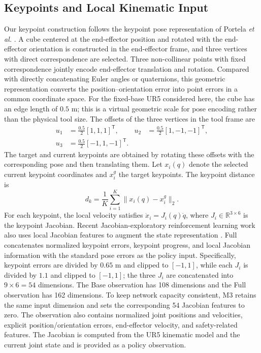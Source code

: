 \documentclass[conference]{IEEEtran}
\begin{document}
\subsection{Keypoints and Local Kinematic Input}
Our keypoint construction follows the keypoint pose representation of Portela \emph{et al.} \cite{portela2025wholebody}. A cube centered at the end-effector position and rotated with the end-effector orientation is constructed in the end-effector frame, and three vertices with direct correspondence are selected. Three non-collinear points with fixed correspondence jointly encode end-effector translation and rotation. Compared with directly concatenating Euler angles or quaternions, this geometric representation converts the position--orientation error into point errors in a common coordinate space. For the fixed-base UR5 considered here, the cube has an edge length of $0.5$ m; this is a virtual geometric scale for pose encoding rather than the physical tool size. The offsets of the three vertices in the tool frame are
\begin{equation*}
\begin{aligned}
u_1&=\tfrac{0.5}{2}[1,1,1]^{\mathsf T}, &
u_2&=\tfrac{0.5}{2}[1,-1,-1]^{\mathsf T},\\
u_3&=\tfrac{0.5}{2}[-1,1,-1]^{\mathsf T}.&&
\end{aligned}
\end{equation*}
The target and current keypoints are obtained by rotating these offsets with the corresponding pose and then translating them. Let $x_i(q)$ denote the selected current keypoint coordinates and $x_i^g$ the target keypoints. The keypoint distance is
\begin{equation}
d_k=\frac{1}{K}\sum_{i=1}^{K}\|x_i(q)-x_i^g\|_2 .
\label{eq:keypoint}
\end{equation}
For each keypoint, the local velocity satisfies $\dot x_i=J_i(q)\dot q$, where $J_i\in\mathbb{R}^{3\times6}$ is the keypoint Jacobian. Recent Jacobian-exploratory reinforcement learning work also uses local Jacobian features to augment the state representation \cite{tian2025jedprl}. Full concatenates normalized keypoint errors, keypoint progress, and local Jacobian information with the standard pose errors as the policy input. Specifically, keypoint errors are divided by $0.65$ m and clipped to $[-1,1]$, while each $J_i$ is divided by $1.1$ and clipped to $[-1,1]$; the three $J_i$ are concatenated into $9\times6=54$ dimensions. The Base observation has 108 dimensions and the Full observation has 162 dimensions. To keep network capacity consistent, M3 retains the same input dimension and sets the corresponding 54 Jacobian features to zero. The observation also contains normalized joint positions and velocities, explicit position/orientation errors, end-effector velocity, and safety-related features. The Jacobian is computed from the UR5 kinematic model and the current joint state and is provided as a policy observation.
\end{document}
